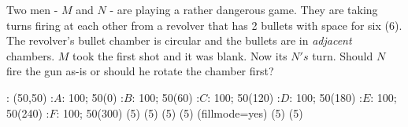 

\question[3] Two men - $M$ and $N$ - are playing a rather dangerous game. They are taking
turns firing at each other from a revolver that has 2 bullets with space for six (6). 
The revolver's bullet chamber is circular and the bullets are in \textit{adjacent} chambers.
$M$ took the first shot and it was blank. Now its $N's$ turn. Should $N$ fire the gun as-is
or should he rotate the chamber first? 


\ifprintanswers
  \begin{marginfigure}
      : (50,50)
       :$A$: 100; 50(0)
       :$B$: 100; 50(60)
       :$C$: 100; 50(120)
       :$D$: 100; 50(180)
       :$E$: 100; 50(240)
       :$F$: 100; 50(300)
    \figdrawbegin{}
       (5)
       (5)
       (5)
       (5)
      \figset (fillmode=yes)
       (5)
       (5)
    \figdrawend
    \centerline{\box\figBoxA}
  \end{marginfigure}
\fi 

